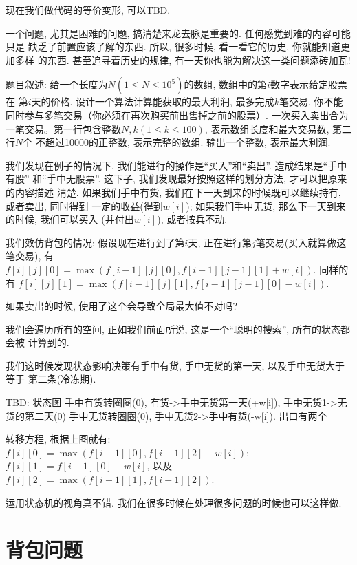 现在我们做代码的等价变形, 可以TBD. 

\begin{remark}
    一个问题, 尤其是困难的问题, 搞清楚来龙去脉是重要的. 任何感觉到难的内容可能只是
    缺乏了前置应该了解的东西. 所以, 很多时候, 看一看它的历史, 你就能知道更加多样
    的东西. 甚至追寻着历史的规律, 有一天你也能为解决这一类问题添砖加瓦! 
\end{remark}

 题目叙述: 给一个长度为$N(1\leq N \leq 10^5)$的数组, 数组中的第$i$数字表示给定股票在
第$i$天的价格. 设计一个算法计算能获取的最大利润, 最多完成$k$笔交易. 你不能同时参与多笔交易（你必须在再次购买前出售掉之前的股票）.
一次买入卖出合为一笔交易。第一行包含整数$N,k(1\leq k\leq 100)$, 表示数组长度和最大交易数, 第二行$N$个
不超过10000的正整数, 表示完整的数组. 输出一个整数, 表示最大利润. 

我们发现在例子的情况下, 我们能进行的操作是``买入''和``卖出''. 造成结果是``手中有股''
和``手中无股票''. 这下子, 我们发现最好按照这样的划分方法, 才可以把原来的内容描述
清楚. 如果我们手中有货, 我们在下一天到来的时候既可以继续持有, 或者卖出, 同时得到
一定的收益(得到$w[i]$); 
如果我们手中无货, 那么下一天到来的时候, 我们可以买入 (并付出$w[i]$), 
或者按兵不动. 

我们效仿背包的情况: 假设现在进行到了第$i$天, 正在进行第$j$笔交易(买入就算做这笔交易), 有
$f[i][j][0]=\max(f[i-1][j][0], f[i-1][j-1][1]+w[i])$. 同样的有 
$f[i][j][1]=\max(f[i-1][j][1], f[i-1][j-1][0]-w[i])$. 

\begin{ques}
    如果卖出的时候, 使用了这个会导致全局最大值不对吗? 
\end{ques}

我们会遍历所有的空间, 正如我们前面所说, 这是一个``聪明的搜索'', 所有的状态都会被
计算到的. 

我们这时候发现状态影响决策有手中有货, 手中无货的第一天, 以及手中无货大于等于
第二条(冷冻期). 

TBD: 状态图 手中有货转圈圈(0), 有货->手中无货第一天(+w[i]), 手中无货1->无货的第二天(0) 
手中无货转圈圈(0), 手中无货2->手中有货(-w[i]). 出口有两个

转移方程, 根据上图就有: $f[i][0] = \max(f[i-1][0], f[i-1][2]-w[i])$; 
$f[i][1]=f[i-1][0]+w[i]$, 以及$f[i][2]=\max(f[i-1][1],f[i-1][2])$. 

运用状态机的视角真不错. 我们在很多时候在处理很多问题的时候也可以这样做. 

\section{背包问题} 

